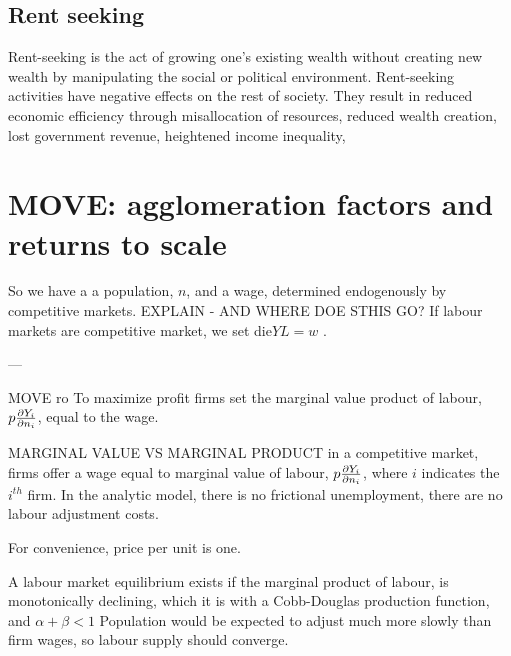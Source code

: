 \subsection{Rent seeking}
  Rent-seeking is the act of growing one's existing wealth without creating new wealth by manipulating the social or political environment. Rent-seeking activities have negative effects on the rest of society. They result in reduced economic efficiency through misallocation of resources, reduced wealth creation, lost government revenue, heightened income inequality,


\section{MOVE: agglomeration factors and returns to scale}

So we have a a population, $n$, and a wage, determined endogenously by competitive markets. 
EXPLAIN - AND WHERE DOE STHIS GO?
If labour markets are \gls{competitive market}, we set die${Y}{L}=w$ .

---

MOVE ro
To maximize profit  firms set the marginal value product of labour, $p\frac{\partial Y_i}{\partial n_i}$, 
equal to the wage. 

MARGINAL VALUE VS MARGINAL PRODUCT
in a competitive market, firms offer a wage equal to marginal value of labour, 
 $p\frac{\partial Y_i}{\partial n_i}$, where $i$ indicates the $i^{th}$ firm. In the analytic model, there is no \gls{frictional unemployment}, there are no \glspl{labour adjustment cost}. 

 For convenience, price per unit is one. 

A labour market equilibrium exists if the marginal product of labour, is monotonically declining, which it is with a \gls{Cobb-Douglas} production function, and $\alpha + \beta<1$ 
Population would be expected to adjust much more slowly than firm wages, so labour supply should converge.

